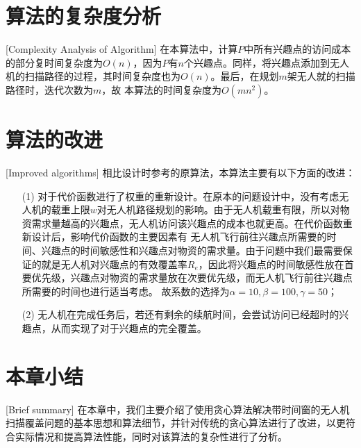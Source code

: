 \section{算法的复杂度分析}[Complexity Analysis of Algorithm]
在本算法中，计算$P$中所有兴趣点的访问成本的部分复时间复杂度为$O(n)$，因为$P$有$n$个兴趣点。同样，将兴趣点添加到无人机的扫描路径的过程，其时间复杂度也为$O(n)$。最后，在规划$m$架无人就的扫描路径时，迭代次数为$m$，故
本算法的时间复杂度为$O(mn^2)$。

\section{算法的改进}[Improved algorithms]
相比设计时参考的原算法，本算法主要有以下方面的改进：
\begin{itemize}
	\item [(1)] 对于代价函数进行了权重的重新设计。在原本的问题设计中，没有考虑无人机的载重上限$w$对无人机路径规划的影响。由于无人机载重有限，所以对物资需求量越高的兴趣点，无人机访问该兴趣点的成本也就更高。在代价函数重新设计后，影响代价函数的主要因素有
无人机飞行前往兴趣点所需要的时间、兴趣点的时间敏感性和兴趣点对物资的需求量。由于问题中我们最需要保证的就是无人机对兴趣点的有效覆盖率$R_e$，因此将兴趣点的时间敏感性放在首要优先级，兴趣点对物资的需求量放在次要优先级，而无人机飞行前往兴趣点所需要的时间也进行适当考虑。
故系数的选择为$\alpha = 10,\beta = 100,\gamma = 50$；
	\item [(2)] 无人机在完成任务后，若还有剩余的续航时间，会尝试访问已经超时的兴趣点，从而实现了对于兴趣点的完全覆盖。
\end{itemize}

\section{本章小结}[Brief summary]
在本章中，我们主要介绍了使用贪心算法解决带时间窗的无人机扫描覆盖问题的基本思想和算法细节，并针对传统的贪心算法进行了改进，以更符合实际情况和提高算法性能，同时对该算法的复杂性进行了分析。